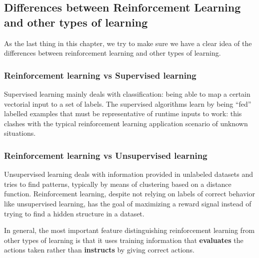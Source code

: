 \subsection{Differences between Reinforcement Learning and other types of learning}
As the last thing in this chapter, we try to make sure we have a clear idea of the differences between reinforcement learning and other types of learning.

\subsubsection{Reinforcement learning vs Supervised learning}
Supervised learning mainly deals with classification: being able to map a certain vectorial input to a set of labels. The supervised algorithms learn by being ``fed'' labelled examples that must be representative of runtime inputs to work: this clashes with the typical reinforcement learning application scenario of unknown situations.

\subsubsection{Reinforcement learning vs Unsupervised learning}
Unsupervised learning deals with information provided in unlabeled datasets and tries to find patterns, typically by means of clustering based on a distance function. Reinforcement learning, despite not relying on labels of correct behavior like unsupervised learning, has the goal of maximizing a reward signal instead of trying to find a hidden structure in a dataset.

In general, the most important feature distinguishing reinforcement learning from other types of learning is that it uses training information that \textbf{evaluates} the actions taken rather than \textbf{instructs} by giving correct actions.
